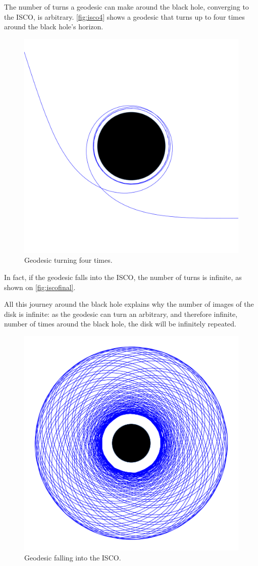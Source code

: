 The number of turns a geodesic can make around the black hole, converging to the \ac{ISCO}, is arbitrary. \autoref{fig:isco4} shows a geodesic that turns up to four times around the black hole's horizon.
	
\begin{figure}[bth]
	\myfloatalign
	\includegraphics[width=.5\linewidth]{gfx/isco4}
	\caption[Geodesic turning four times]{Geodesic turning four times.}
	\label{fig:isco4}
\end{figure}

In fact, if the geodesic falls into the \ac{ISCO}, the number of turns is infinite, as shown on \autoref{fig:iscofinal}.

All this journey around the black hole explains why the number of images of the disk is infinite: as the geodesic can turn an arbitrary, and therefore infinite, number of times around the black hole, the disk will be infinitely repeated.

\begin{figure}[bth]
	\myfloatalign
	\includegraphics[width=.7\linewidth]{gfx/iscofinal}
	\caption[Geodesic falling into the ISCO]{Geodesic falling into the \ac{ISCO}.}
	\label{fig:iscofinal}
\end{figure}